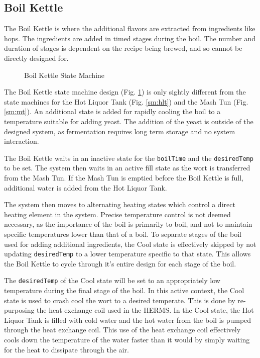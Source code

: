 \documentclass[letterpaper, 10 pt, conference]{ieeeconf}  %
\begin{document}
\subsection{Boil Kettle}

The Boil Kettle is where the additional flavors are extracted from ingredients like hops. The ingredients are added in timed stages during the boil. The number and duration of stages is dependent on the recipe being brewed, and so cannot be directly designed for. 

\begin{figure}[!htb]
  \centering
  
  \caption{Boil Kettle State Machine}
  \label{sm:bk}
\end{figure}

The Boil Kettle state machine design (Fig. \ref{sm:bk}) is only sightly different from the state machines for the Hot Liquor Tank (Fig. \ref{sm:hlt}) and the Mash Tun (Fig. \ref{sm:mt}). An additional state is added for rapidly cooling the boil to a temperature suitable for adding yeast. The addition of the yeast is outside of the designed system, as fermentation requires long term storage and no system interaction.

The Boil Kettle waits in an inactive state for the \texttt{boilTime} and the \texttt{desiredTemp} to be set. The system then waits in an active fill state as the wort is transferred from the Mash Tun. If the Mash Tun is emptied before the Boil Kettle is full, additional water is added from the Hot Liquor Tank.

The system then moves to alternating heating states which control a direct heating element in the system. Precise temperature control is not deemed necessary, as the importance of the boil is primarily to boil, and not to maintain specific temperatures lower than that of a boil. To separate stages of the boil used for adding additional ingredients, the Cool state is effectively skipped by not updating \texttt{desiredTemp} to a lower temperature specific to that state. This allows the Boil Kettle to cycle through it's entire design for each stage of the boil.

The \texttt{desiredTemp} of the Cool state will be set to an appropriately low temperature during the final stage of the boil. In this active context, the Cool state is used to crash cool the wort to a desired temperate. This is done by re-purposing the heat exchange coil used in the HERMS. In the Cool state, the Hot Liquor Tank is filled with cold water and the hot water from the boil is pumped through the heat exchange coil. This use of the heat exchange coil effectively cools down the temperature of the water faster than it would by simply waiting for the heat to dissipate through the air.
\end{document}
